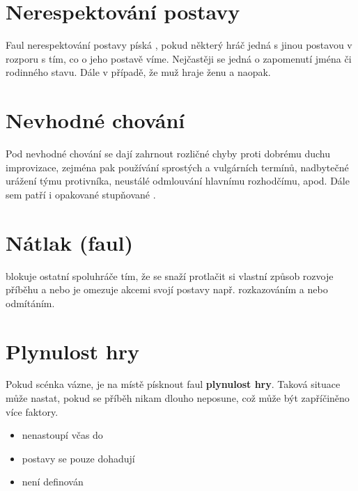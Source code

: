  
\needspace{5cm} \section{Nerespektování postavy} \label{nerespektování postavy}  
 
Faul nerespektování postavy píská , pokud některý hráč  
jedná s jinou postavou v rozporu s tím, co o jeho postavě víme. 
Nejčastěji se jedná o zapomenutí jména či rodinného stavu. 
Dále v případě, že muž hraje ženu a naopak. 
\needspace{5cm} \section{Nevhodné chování} \label{nevhodné chování}  
 
 
Pod nevhodné chování se dají zahrnout rozličné chyby proti dobrému duchu 
improvizace, zejména pak používání sprostých a vulgárních termínů, 
nadbytečné urážení týmu protivníka, neustálé odmlouvání hlavnímu rozhodčímu,  
apod. Dále sem patří i opakované stupňované . 
\needspace{5cm} \section{Nátlak (faul)} \label{nátlak (faul)}  
 blokuje ostatní spoluhráče tím, že se snaží protlačit si vlastní způsob rozvoje příběhu a nebo je omezuje akcemi svojí postavy např. rozkazováním a nebo odmítáním. 
 
 
\needspace{5cm} \section{Plynulost hry} \label{plynulost hry}  
 
Pokud scénka vázne, je na místě písknout faul \textbf{plynulost hry}{}. Taková situace může nastat, pokud se příběh nikam dlouho neposune, což může být zapříčiněno více faktory. 
 
\begin{itemize}
\item  {} nenastoupí včas do 
\item  postavy se pouze dohadují
\item  není definován 
\end{itemize}
 
